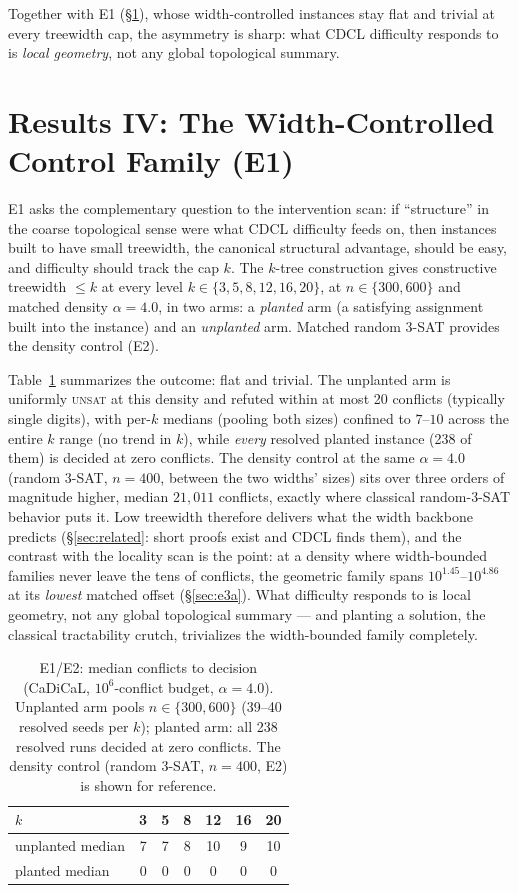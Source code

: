 \documentclass[manuscript, screen, review]{jair}
\begin{document}
Together with E1 (\S\ref{sec:e1}), whose width-controlled instances stay flat
and trivial at every treewidth cap, the asymmetry is sharp: what CDCL
difficulty responds to is \emph{local geometry}, not any global topological
summary.

\section{Results IV: The Width-Controlled Control Family (E1)}
\label{sec:e1}

E1 asks the complementary question to the intervention scan: if
``structure'' in the coarse topological sense were what CDCL difficulty
feeds on, then instances built to have small treewidth, the canonical
structural advantage, should be easy, and difficulty should track the
cap $k$. The $k$-tree construction gives constructive treewidth $\le k$ at
every level $k \in \{3,5,8,12,16,20\}$, at $n \in \{300,600\}$ and matched
density $\alpha = 4.0$, in two arms: a \emph{planted} arm (a satisfying
assignment built into the instance) and an \emph{unplanted} arm. Matched
random 3-SAT provides the density control (E2).

Table~\ref{tab:e1} summarizes the outcome: flat and trivial. The unplanted
arm is uniformly \textsc{unsat} at this density and refuted within at most 20 conflicts (typically single
digits), with per-$k$ medians (pooling both
sizes) confined to $7$--$10$ across the entire $k$ range (no trend in
$k$), while \emph{every} resolved planted instance (238 of them) is
decided at zero conflicts. The density control at the same $\alpha = 4.0$
(random 3-SAT, $n{=}400$, between the two widths' sizes) sits over three
orders of magnitude higher, median $21{,}011$ conflicts, exactly where
classical random-3-SAT behavior puts it. Low treewidth therefore delivers
what the width backbone predicts (\S\ref{sec:related}: short proofs exist
and CDCL finds them), and the contrast with the locality scan is the point:
at a density where width-bounded families never leave the tens of
conflicts, the geometric family spans $10^{1.45}$--$10^{4.86}$ at its
\emph{lowest} matched offset (\S\ref{sec:e3a}). What difficulty responds to
is local geometry, not any global topological summary --- and planting a
solution, the classical tractability crutch, trivializes the width-bounded
family completely.

\begin{table}[h]
\centering
\caption{E1/E2: median conflicts to decision (CaDiCaL, $10^6$-conflict
budget, $\alpha = 4.0$). Unplanted arm pools $n \in \{300,600\}$ (39--40
resolved seeds per $k$); planted arm: all 238 resolved runs decided at
zero conflicts. The density control (random 3-SAT, $n{=}400$, E2) is shown
for reference.}
\label{tab:e1}
\begin{tabular}{lcccccc}
\toprule
$k$ & 3 & 5 & 8 & 12 & 16 & 20\\
\midrule
unplanted median & 7 & 7 & 8 & 10 & 9 & 10\\
planted median & 0 & 0 & 0 & 0 & 0 & 0\\
\bottomrule
\end{tabular}
\end{table}
\end{document}
